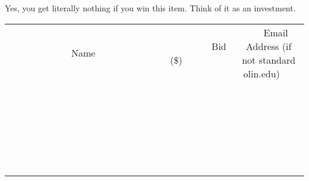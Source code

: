 \documentclass[11pt]{article}
\begin{document}
Yes, you get literally nothing if you win this item. Think of it as an investment. \\
					[6ex]
					\begin{tabular}{c c c}
						~~~~~~~~~~~~~Name~~~~~~~~~~~~~ & ~~~~~~~~~Bid (\$)~~~~~~~~~ & ~~~Email Address (if not standard olin.edu)~~~ \\
				
 & & \\
\hline
 & & \\
\hline
 & & \\
\hline
 & & \\
\hline
 & & \\
\hline
 & & \\
\hline
 & & \\
\hline
 & & \\
\hline
 & & \\
\hline
 & & \\
\hline
 & & \\
\hline
 & & \\
\hline
 & & \\
\hline
 & & \\
\hline
 & & \\
\hline
 & & \\
\hline
 & & \\
\hline
 & & \\
\hline
 & & \\
\hline
 & & \\
\hline
 & & \\
\hline
 & & \\
\hline
 & & \\
\hline
 & & \\
\hline
 & & \\
\hline
 & & \\
\hline
					\end{tabular}
					\clearpage
				
\end{document}
